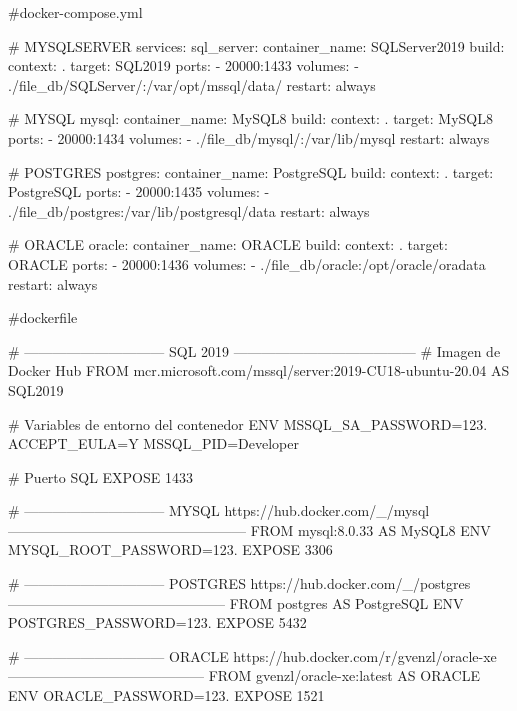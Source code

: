 #docker-compose.yml

#     MYSQLSERVER
services:
  sql_server:
    container_name: SQLServer2019
    build: 
      context: .
      target: SQL2019
    ports:
      - 20000:1433
    volumes:
      - ./file_db/SQLServer/:/var/opt/mssql/data/
    restart: always

#     MYSQL
  mysql:
    container_name: MySQL8
    build:
      context: .
      target: MySQL8
    ports:
      - 20000:1434
    volumes:
      - ./file_db/mysql/:/var/lib/mysql
    restart: always

#     POSTGRES
  postgres:
    container_name: PostgreSQL
    build: 
      context: .
      target: PostgreSQL
    ports:
      - 20000:1435
    volumes:
      - ./file_db/postgres:/var/lib/postgresql/data
    restart: always
    
#     ORACLE 
  oracle:
    container_name: ORACLE
    build: 
      context: .
      target: ORACLE
    ports:
      - 20000:1436
    volumes:
      - ./file_db/oracle:/opt/oracle/oradata
    restart: always
    
    
    #dockerfile
    
    # ------------------------------ SQL 2019 ---------------------------------------
# Imagen de Docker Hub
FROM mcr.microsoft.com/mssql/server:2019-CU18-ubuntu-20.04 AS SQL2019

# Variables de entorno del contenedor
ENV MSSQL_SA_PASSWORD=123. ACCEPT_EULA=Y MSSQL_PID=Developer 

# Puerto SQL
EXPOSE 1433

# ------------------------------ MYSQL https://hub.docker.com/_/mysql ---------------------------------------------------
FROM mysql:8.0.33 AS MySQL8
ENV MYSQL_ROOT_PASSWORD=123.
EXPOSE 3306

# ------------------------------ POSTGRES https://hub.docker.com/_/postgres -----------------------------------------------
FROM postgres AS PostgreSQL
ENV POSTGRES_PASSWORD=123.
EXPOSE 5432

# ------------------------------ ORACLE https://hub.docker.com/r/gvenzl/oracle-xe ------------------------------------------
FROM gvenzl/oracle-xe:latest AS ORACLE
ENV ORACLE_PASSWORD=123.
EXPOSE 1521
